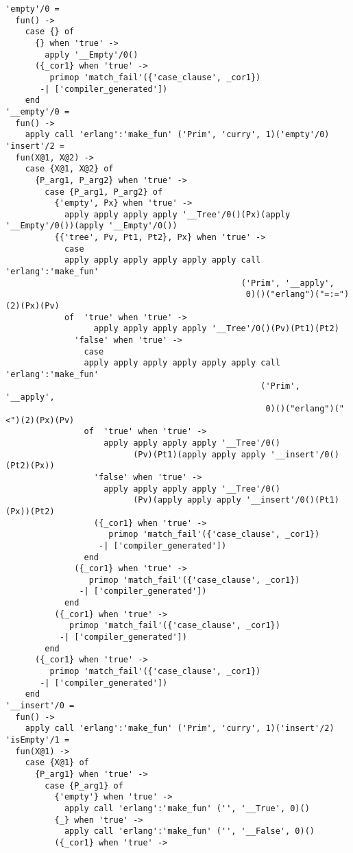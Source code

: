 \begin{lstlisting}
'empty'/0 =
  fun() ->
    case {} of
      {} when 'true' ->
        apply '__Empty'/0()
      ({_cor1} when 'true' ->
         primop 'match_fail'({'case_clause', _cor1})
       -| ['compiler_generated'])
    end
'__empty'/0 =
  fun() ->
    apply call 'erlang':'make_fun' ('Prim', 'curry', 1)('empty'/0)
'insert'/2 =
  fun(X@1, X@2) ->
    case {X@1, X@2} of
      {P_arg1, P_arg2} when 'true' ->
        case {P_arg1, P_arg2} of
          {'empty', Px} when 'true' ->
            apply apply apply apply '__Tree'/0()(Px)(apply '__Empty'/0())(apply '__Empty'/0())
          {{'tree', Pv, Pt1, Pt2}, Px} when 'true' ->
            case
            apply apply apply apply apply apply call 'erlang':'make_fun'
                                                ('Prim', '__apply',
                                                 0)()("erlang")("=:=")(2)(Px)(Pv)
            of  'true' when 'true' ->
                  apply apply apply apply '__Tree'/0()(Pv)(Pt1)(Pt2)
              'false' when 'true' ->
                case
                apply apply apply apply apply apply call 'erlang':'make_fun'
                                                    ('Prim', '__apply',
                                                     0)()("erlang")("<")(2)(Px)(Pv)
                of  'true' when 'true' ->
                    apply apply apply apply '__Tree'/0()
                          (Pv)(Pt1)(apply apply apply '__insert'/0()(Pt2)(Px))
                  'false' when 'true' ->
                    apply apply apply apply '__Tree'/0()
                          (Pv)(apply apply apply '__insert'/0()(Pt1)(Px))(Pt2)
                  ({_cor1} when 'true' ->
                     primop 'match_fail'({'case_clause', _cor1})
                   -| ['compiler_generated'])
                end
              ({_cor1} when 'true' ->
                 primop 'match_fail'({'case_clause', _cor1})
               -| ['compiler_generated'])
            end
          ({_cor1} when 'true' ->
             primop 'match_fail'({'case_clause', _cor1})
           -| ['compiler_generated'])
        end
      ({_cor1} when 'true' ->
         primop 'match_fail'({'case_clause', _cor1})
       -| ['compiler_generated'])
    end
'__insert'/0 =
  fun() ->
    apply call 'erlang':'make_fun' ('Prim', 'curry', 1)('insert'/2)
'isEmpty'/1 =
  fun(X@1) ->
    case {X@1} of
      {P_arg1} when 'true' ->
        case {P_arg1} of
          {'empty'} when 'true' ->
            apply call 'erlang':'make_fun' ('', '__True', 0)()
          {_} when 'true' ->
            apply call 'erlang':'make_fun' ('', '__False', 0)()
          ({_cor1} when 'true' ->

\end{lstlisting}
